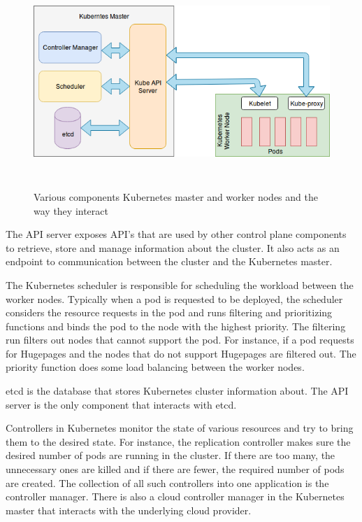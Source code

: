 \documentclass[english, 12pt, a4paper, elec, utf8, a-1b, online]{aaltothesis}
\begin{document}
\begin{figure}[htb]
\begin{center}
\includegraphics[height=8cm,width=15cm]{pics/k8s.png}
\end{center}
\caption{Various components Kubernetes master and worker nodes and the way they interact}
\label{fig-k8s}
\end{figure}

The API server exposes API's that are used by other control plane components to retrieve, store and manage information about the cluster. It also acts as an endpoint to communication between the cluster and the Kubernetes master.

The Kubernetes scheduler is responsible for scheduling the workload between the worker nodes. Typically when a pod is requested to be deployed, the scheduler considers the resource requests in the pod and runs  filtering and prioritizing functions and binds the pod to the node with the highest priority. The filtering run filters out nodes that cannot support the pod. For instance, if a pod requests for Hugepages and the nodes that do not support Hugepages are filtered out. The priority function does some load balancing between the worker nodes.

etcd is the database that stores Kubernetes cluster information about. The API server is the only component that interacts with etcd.

Controllers in Kubernetes monitor the state of various resources and try to bring them to the desired state. For instance, the replication controller makes sure the desired number of pods are running in the cluster. If there are too many, the unnecessary ones are killed and if there are fewer, the required number of pods are created. The collection of all such controllers into one application is the controller manager. There is also a cloud controller manager in the Kubernetes master that interacts with the underlying cloud provider.
\end{document}
